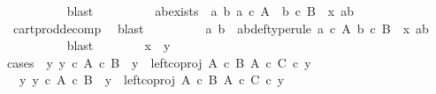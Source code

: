 \begin{isabellebody}
\ \ \ \ \ \ \ \ \isamarkupfalse%
\ blast\isanewline
\ \ \ \ \ \ \isamarkupfalse%
\ \isamarkupfalse%
\ ab{\isacharunderscore}{\kern0pt}exists{\isacharcolon}{\kern0pt}\ {\isachardoublequoteopen}{\isasymexists}\ a\ b{\isachardot}{\kern0pt}\ a\ {\isasymin}\isactrlsub c\ A\ {\isasymand}\ b\ {\isasymin}\isactrlsub c\ B\ {\isasymand}\ x{\isacharprime}{\kern0pt}\ {\isacharequal}{\kern0pt}{\isasymlangle}a{\isacharcomma}{\kern0pt}b{\isasymrangle}{\isachardoublequoteclose}\isanewline
\ \ \ \ \ \ \ \ \isamarkupfalse%
\ cart{\isacharunderscore}{\kern0pt}prod{\isacharunderscore}{\kern0pt}decomp\ \isamarkupfalse%
\ blast\isanewline
\ \ \ \ \ \ \isamarkupfalse%
\ \isamarkupfalse%
\ a\ b\ \ ab{\isacharunderscore}{\kern0pt}def{\isacharbrackleft}{\kern0pt}type{\isacharunderscore}{\kern0pt}rule{\isacharbrackright}{\kern0pt}{\isacharcolon}{\kern0pt}\ {\isachardoublequoteopen}a\ {\isasymin}\isactrlsub c\ A{\isachardoublequoteclose}\ {\isachardoublequoteopen}b\ {\isasymin}\isactrlsub c\ B{\isachardoublequoteclose}\ \ {\isachardoublequoteopen}x{\isacharprime}{\kern0pt}\ {\isacharequal}{\kern0pt}{\isasymlangle}a{\isacharcomma}{\kern0pt}b{\isasymrangle}{\isachardoublequoteclose}\isanewline
\ \ \ \ \ \ \ \ \isamarkupfalse%
\ blast\isanewline
\ \ \ \ \ \ \isamarkupfalse%
\ {\isachardoublequoteopen}x\ {\isacharequal}{\kern0pt}\ y{\isachardoublequoteclose}\ \ \isanewline
\ \ \ \ \ \ \isamarkupfalse%
{\isacharparenleft}{\kern0pt}cases\ {\isachardoublequoteopen}{\isasymexists}\ y{\isacharprime}{\kern0pt}{\isachardot}{\kern0pt}\ y{\isacharprime}{\kern0pt}\ {\isasymin}\isactrlsub c\ A\ {\isasymtimes}\isactrlsub c\ B\ {\isasymand}\ y\ {\isacharequal}{\kern0pt}\ {\isacharparenleft}{\kern0pt}left{\isacharunderscore}{\kern0pt}coproj\ {\isacharparenleft}{\kern0pt}A\ {\isasymtimes}\isactrlsub c\ B{\isacharparenright}{\kern0pt}\ {\isacharparenleft}{\kern0pt}A\ {\isasymtimes}\isactrlsub c\ C{\isacharparenright}{\kern0pt}{\isacharparenright}{\kern0pt}\ {\isasymcirc}\isactrlsub c\ y{\isacharprime}{\kern0pt}{\isachardoublequoteclose}{\isacharparenright}{\kern0pt}\isanewline
\ \ \ \ \ \ \ \ \isamarkupfalse%
\ {\isachardoublequoteopen}{\isasymexists}\ y{\isacharprime}{\kern0pt}{\isachardot}{\kern0pt}\ y{\isacharprime}{\kern0pt}\ {\isasymin}\isactrlsub c\ A\ {\isasymtimes}\isactrlsub c\ B\ {\isasymand}\ y\ {\isacharequal}{\kern0pt}\ {\isacharparenleft}{\kern0pt}left{\isacharunderscore}{\kern0pt}coproj\ {\isacharparenleft}{\kern0pt}A\ {\isasymtimes}\isactrlsub c\ B{\isacharparenright}{\kern0pt}\ {\isacharparenleft}{\kern0pt}A\ {\isasymtimes}\isactrlsub c\ C{\isacharparenright}{\kern0pt}{\isacharparenright}{\kern0pt}\ {\isasymcirc}\isactrlsub c\ y{\isacharprime}{\kern0pt}{\isachardoublequoteclose}\isanewline

\end{isabellebody}
